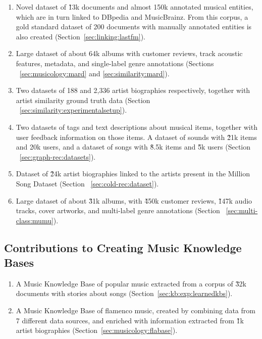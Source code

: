 \begin{enumerate}

\item 
Novel dataset of \~13k documents and almost 150k annotated musical entities, which are in turn linked to DBpedia and MusicBrainz. From this corpus, a gold standard dataset of 200 documents with manually annotated entities is also created (Section~\ref{sec:linking:lastfm}).

\item
Large dataset of about 64k albums with customer reviews, track acoustic features, metadata, and single-label genre annotations (Sections ~\ref{sec:musicology:mard} and \ref{sec:similarity:mard}).

\item
Two datasets of 188 and 2,336 artist biographies respectively, together with artist similarity ground truth data (Section ~\ref{sec:similarity:experimentalsetup}).

\item
Two datasets of tags and text descriptions about musical items, together with user feedback information on those items. A dataset of sounds with \~21k items and 20k users, and a dataset of songs with \~8.5k items and \~5k users (Section ~\ref{sec:graph-rec:datasets}).

\item
Dataset of \~24k artist biographies linked to the artists present in the Million Song Dataset (Section ~\ref{sec:cold-rec:dataset}).

\item
Large dataset of about \~31k albums, with \~450k customer reviews, \~147k audio tracks, cover artworks, and multi-label genre annotations (Section ~\ref{sec:multi-class:mumu}).

\end{enumerate}

\subsection{Contributions to Creating Music Knowledge Bases}

\begin{enumerate}
\item
A Music Knowledge Base of popular music extracted from a corpus of \~32k documents with stories about songs (Section~\ref{sec:kb:exp:learnedkbs}).

\item
A Music Knowledge Base of flamenco music, created by combining data from 7 different data sources, and enriched with information extracted from \~1k artist biographies (Section~\ref{sec:musicology:flabase}).

\end{enumerate}

